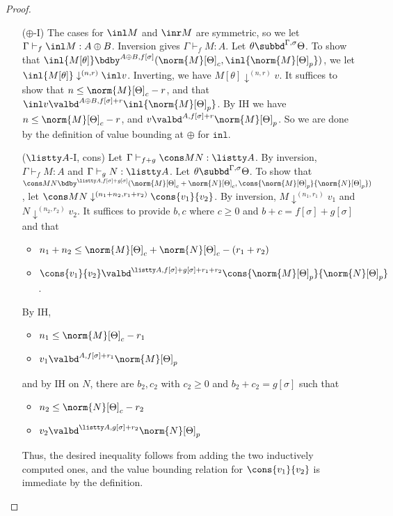 \begin{proof}
\begin{itemize}
\item[($\oplus$-I)] The cases for $\inl M$ and $\inr M$ are symmetric, so we let $\Gamma \vdash_f \inl M : A \oplus B$. Inversion gives $\Gamma \vdash_f M : A$. Let $\theta \subbd^{\Gamma,\sigma} \Theta$. 
To show that $\inl {M[\theta]} \bdby^{A \oplus B,f[\sigma]} (\norm{M}[\Theta]_c,\inl{\norm{M}[\Theta]_p})$,
we let $\inl{M[\theta]} \downarrow^{(n,r)} \inl v$. 
Inverting, we have $M[\theta] \downarrow^{(n,r)} v$. 
It suffices to show that $n \leq \norm{M}[\Theta]_c - r$, and that $\inl v \valbd^{A \oplus B,f[\sigma] + r} \inl {\norm{M}[\Theta]_p}$. By IH we have $n \leq \norm{M}[\Theta]_c - r$, and $v \valbd^{A,f[\sigma] + r} \norm{M}[\Theta]_p$. So we are done by the definition of value bounding at $\oplus$ for $\texttt{inl}$.

\item[($\listty A$-I, cons)] Let $\Gamma \vdash_{f+g} \cons M N : \listty A$. 
By inversion, $\Gamma \vdash_f M : A$ and $\Gamma \vdash_g N : \listty A$.
Let $\theta \subbd^{\Gamma,\sigma} \Theta$. 
To show that $\cons M N \bdby^{\listty A, f[\sigma] + g[\sigma]} (\norm{M}[\Theta]_c + \norm{N}[\Theta]_c, \cons {\norm{M}[\Theta]_p} {\norm{N}[\Theta]_p})$, 
let $\cons M N \downarrow^{(n_1 + n_2,r_1 + r_2)} \cons {v_1} {v_2}$. 
By inversion, $M \downarrow^{(n_1,r_1)} v_1$ and $N \downarrow^{(n_2,r_2)} v_2$. It suffices to provide $b,c$ where $c \geq 0$ and $b + c = f[\sigma] + g[\sigma]$ and that
\begin{itemize}
  \item $n_1 + n_2 \leq\norm{M}[\Theta]_c + \norm{N}[\Theta]_c - (r_1 + r_2)$
  \item $\cons {v_1} {v_2} \valbd^{\listty A, f[\sigma] + g[\sigma] + r_1 + r_2} \cons {\norm{M}[\Theta]_p} {\norm{N}[\Theta]_p}$.
\end{itemize}
By IH,
\begin{itemize}
  \item $n_1 \leq \norm{M}[\Theta]_c - r_1$
  \item $v_1 \valbd^{A,f[\sigma] + r_1} \norm{M}[\Theta]_p$
\end{itemize}
and by IH on $N$, there are $b_2,c_2$ with $c_2 \geq 0$ and $b_2 + c_2 = g[\sigma]$ such that
\begin{itemize}
  \item $n_2 \leq \norm{N}[\Theta]_c - r_2$
  \item $v_2 \valbd^{\listty A,g[\sigma] + r_2} \norm{N}[\Theta]_p$
\end{itemize}
Thus, the desired inequality follows from adding the two inductively computed ones, and the value bounding relation for $\cons {v_1} {v_2}$ is immediate by the definition.




\end{itemize}
\end{proof}
